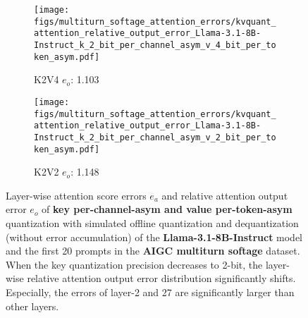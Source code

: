 \begin{figure*}
\begin{subfigure}{0.25\columnwidth}
    \texttt{[image: figs/multiturn\_softage\_attention\_errors/kvquant\_attention\_relative\_output\_error\_Llama-3.1-8B-Instruct\_k\_2\_bit\_per\_channel\_asym\_v\_4\_bit\_per\_token\_asym.pdf]}
    \caption{K2V4 $e_o$: 1.103}
    \label{fig:kvcache_simulated_quant_error_layer_wise_k2_bit_per_channel_asym_v4_per_token_asym_Llama3.1-8B-Instruct_multirurn_softage}
    \end{subfigure}
    \begin{subfigure}{0.25\columnwidth}
    \texttt{[image: figs/multiturn\_softage\_attention\_errors/kvquant\_attention\_relative\_output\_error\_Llama-3.1-8B-Instruct\_k\_2\_bit\_per\_channel\_asym\_v\_2\_bit\_per\_token\_asym.pdf]}
    \caption{K2V2 $e_o$: 1.148}
    \label{fig:kvcache_simulated_quant_error_layer_wise_k2_bit_per_channel_asym_v2_per_token_asym_Llama3.1-8B-Instruct_multirurn_softage}
    \end{subfigure}
    \caption{Layer-wise attention score errors $e_a$ and relative attention output error $e_o$ of \textbf{key per-channel-asym and value per-token-asym} quantization with simulated offline quantization and dequantization (without error accumulation) of the \textbf{Llama-3.1-8B-Instruct} model and the first 20 prompts in the \textbf{AIGC multiturn softage} dataset. When the key quantization precision decreases to 2-bit, the layer-wise relative attention output error distribution significantly shifts. Especially, the errors of layer-2 and 27 are significantly larger than other layers.}
\label{fig:kvcache_simulated_quant_attention_output_relative_error_layer_wise_k_bit_per_channel_asym__v_per_token_asym_llama3.1_8b_multiturn_softage}
\end{figure*}

%
%

